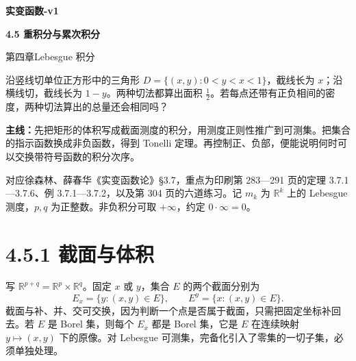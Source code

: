 \documentclass[11pt,a4paper]{article}
\begin{document}
\begin{center}{\LARGE\bfseries 实变函数-v1\par}\vspace{7pt}
{\Large\bfseries 4.5 重积分与累次积分\par}\vspace{6pt}
{第四章\quad Lebesgue 积分\par}\end{center}
沿竖线切单位正方形中的三角形 \(D=\{(x,y):0<y<x<1\}\)，截线长为
\(x\)；沿横线切，截线长为 \(1-y\)。两种切法都算出面积
\(\frac12\)。若每点还带有正负相间的密度，两种切法算出的总量还会相同吗？
\par\textbf{主线：}先把矩形的体积写成截面测度的积分，用测度正则性推广到可测集。把集合的指示函数换成非负函数，得到
Tonelli 定理。再控制正、负部，便能说明何时可以交换带符号函数的积分次序。
\begin{center}
\end{center}
对应徐森林、薛春华《实变函数论》§3.7，重点为印刷第 283---291 页的定理
3.7.1---3.7.6、例 3.7.1---3.7.2，以及第 304 页的六道练习。记 \(m_k\) 为
\(\mathbb R^k\) 上的 Lebesgue 测度，\(p,q\) 为正整数。非负积分可取
\(+\infty\)，约定 \(0\cdot\infty=0\)。
\begingroup\small\setlength{\parskip}{0pt}\tableofcontents\endgroup
\newpage
{}\section[\S{}4.5.1 截面与体积]{4.5.1 截面与体积}\label{ux622aux9762ux4e0eux4f53ux79ef}

写 \(\mathbb R^{p+q}=\mathbb R^p\times\mathbb R^q\)。固定 \(x\) 或
\(y\)，集合 \(E\) 的两个截面分别为 \begin{equation*}
E_x=\{y:(x,y)\in E\},\qquad E^y=\{x:(x,y)\in E\}.
\end{equation*}
截面与补、并、交可交换，因为判断一个点是否属于截面，只需把固定坐标补回去。若
\(E\) 是 Borel 集，则每个 \(E_x\) 都是 Borel 集，它是 \(E\) 在连续映射
\(y\mapsto(x,y)\) 下的原像。对 Lebesgue
可测集，完备化引入了零集的一切子集，必须单独处理。
\end{document}

